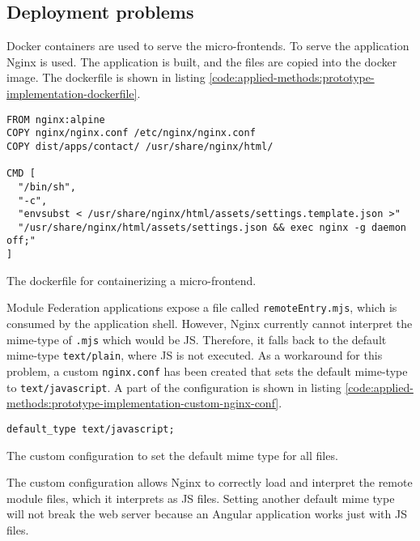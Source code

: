 \subsection{Deployment problems}\label{subsection:applied-methods:prototypical-implementation:nginx-problems}

Docker containers are used to serve the micro-frontends. To serve the application Nginx is used. The application is built, and the files are copied into the docker image. The dockerfile is shown in listing \ref{code:applied-methods:prototype-implementation-dockerfile}.

\ifshowListings
  \begin{listing}[H]
  \begin{verbatim}
FROM nginx:alpine
COPY nginx/nginx.conf /etc/nginx/nginx.conf
COPY dist/apps/contact/ /usr/share/nginx/html/
    
CMD [
  "/bin/sh", 
  "-c", 
  "envsubst < /usr/share/nginx/html/assets/settings.template.json >" 
  "/usr/share/nginx/html/assets/settings.json && exec nginx -g daemon off;"
]
  \end{verbatim}
  \caption{The dockerfile for containerizing a micro-frontend.}\label{code:applied-methods:prototype-implementation-dockerfile}
  \end{listing}
\fi

\noindent Module Federation applications expose a file called \texttt{remoteEntry.mjs}, which is consumed by the application shell. However, Nginx currently cannot interpret the mime-type of \texttt{\*.mjs} which would be \ac{JS}. Therefore, it falls back to the default mime-type \texttt{text/plain}, where \ac{JS} is not executed. As a workaround for this problem, a custom \texttt{nginx.conf} has been created that sets the default mime-type to \texttt{text/javascript}. A part of the configuration is shown in listing \ref{code:applied-methods:prototype-implementation-custom-nginx-conf}.

\ifshowListings
  \begin{listing}[H]
  \begin{verbatim}
default_type text/javascript;
  \end{verbatim}
  \caption{The custom configuration to set the default mime type for all files.}\label{code:applied-methods:prototype-implementation-custom-nginx-conf}
  \end{listing}
\fi

\noindent The custom configuration allows Nginx to correctly load and interpret the remote module files, which it interprets as \ac{JS} files. Setting another default mime type will not break the web server because an Angular application works just with \ac{JS} files.

